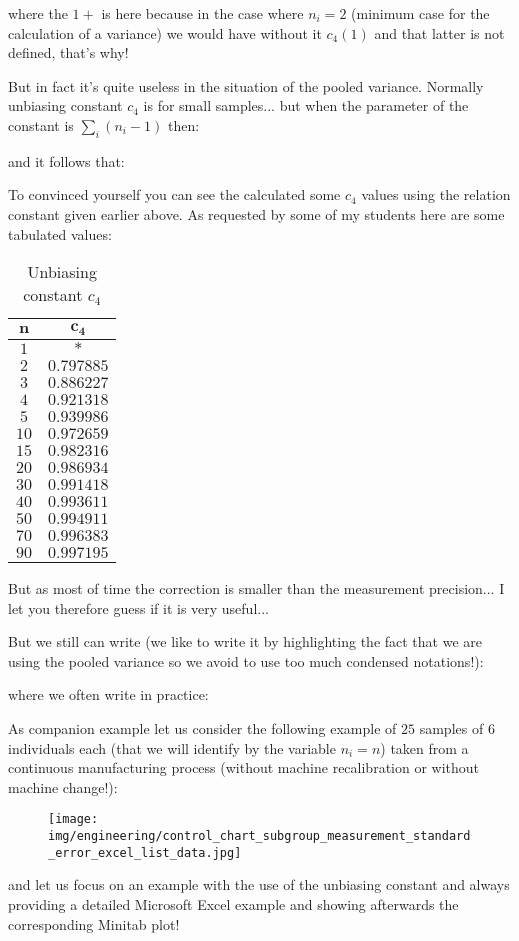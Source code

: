 	where the $1+$ is here because in the case where $n_i=2$ (minimum case for the calculation of a variance) we would have without it $c_4(1)$ and that latter is not defined, that's why!
	
	But in fact it's quite useless in the situation of the pooled variance. Normally unbiasing constant $c_4$ is for small samples... but when the parameter of the constant is $\sum_{i}(n_i-1)$ then:
	
	and it follows that:
	
	To convinced yourself you can see the calculated some $c_4$ values using the relation constant given earlier above. As requested by some of my students here are some tabulated values:
	\begin{table}[H]
	\begin{center}
			\begin{tabular}{|c|c|}
				\hline
				\cellcolor{black!30}$\pmb{n}$ & 
\cellcolor{black!30}$\pmb{c_4}$ \\ \hline
		$1$ & $*$\\ \hline
		$2$ & $0.797885$\\ \hline
		$3$ & $0.886227$\\ \hline
		$4$ & $0.921318$\\ \hline
		$5$ & $0.939986$\\ \hline
		$10$ & $0.972659$\\ \hline
		$15$ & $0.982316$\\ \hline
		$20$ & $0.986934$\\ \hline
		$30$ & $0.991418$\\ \hline
		$40$ & $0.993611$\\ \hline
		$50$ & $0.994911$\\ \hline
		$70$ & $0.996383$\\ \hline
		$90$ & $0.997195$\\ \hline
	\end{tabular}
	\end{center}
	\caption{Unbiasing constant $c_4$}
	\end{table}	
	But as most of time the correction is smaller than the measurement precision... I let you therefore guess if it is very useful...
	
	But we still can write (we like to write it by highlighting the fact that we are using the pooled variance so we avoid to use too much condensed notations!):
	
	where we often write in practice:
	
	As companion example let us consider the following example of $25$ samples of $6$ individuals each (that we will identify by the variable $n_i=n$) taken from a continuous manufacturing process (without machine recalibration or without machine change!):
 	\begin{figure}[H]
		\centering
		\texttt{[image: img/engineering/control\_chart\_subgroup\_measurement\_standard\_error\_excel\_list\_data.jpg]}
	\end{figure}
	and let us focus on an example with the use of the unbiasing constant and always providing a detailed Microsoft Excel example and showing afterwards the corresponding Minitab plot!
	
